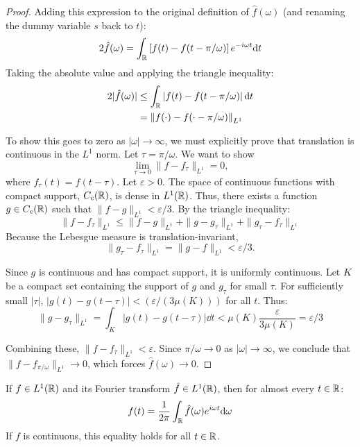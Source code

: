 \begin{proof}
Adding this expression to the original definition of $\hat{f}(\omega)$ (and renaming the dummy variable $s$ back to $t$):
\begin{equation}
2\hat{f}(\omega) = \int_{\mathbb{R}} \left[ f(t) - f(t - \pi/\omega) \right] e^{-i\omega t} \mathrm{d} t
\end{equation}
Taking the absolute value and applying the triangle inequality:
\begin{equation}
\begin{aligned}
2|\hat{f}(\omega)| &\leq \int_{\mathbb{R}} \left| f(t) - f(t - \pi/\omega) \right| \mathrm{d} t \\
&= \left\| f(\cdot) - f(\cdot - \pi/\omega) \right\|_{L^1}
\end{aligned}
\end{equation}

To show this goes to zero as $|\omega| \to \infty$, we must explicitly prove that translation is continuous in the $L^1$ norm. Let $\tau = \pi/\omega$. We want to show \[
\lim_{\tau \to 0} \|f - f_\tau\|_{L^1} = 0,
\] where $f_\tau(t) = f(t-\tau)$.
Let $\varepsilon > 0$. The space of continuous functions with compact support, $C_c(\mathbb{R})$, is dense in $L^1(\mathbb{R})$. Thus, there exists a function $g \in C_c(\mathbb{R})$ such that $\|f - g\|_{L^1} < \varepsilon/3$. By the triangle inequality:
\begin{equation}
\|f - f_\tau\|_{L^1} \leq \|f - g\|_{L^1} + \|g - g_\tau\|_{L^1} + \|g_\tau - f_\tau\|_{L^1}
\end{equation}
Because the Lebesgue measure is translation-invariant,
\[
\|g_\tau - f_\tau\|_{L^1} = \|g - f\|_{L^1} < \varepsilon/3.
\]

Since $g$ is continuous and has compact support, it is uniformly continuous. Let $K$ be a compact set containing the support of $g$ and $g_\tau$ for small $\tau$. For sufficiently small $|\tau|$, $|g(t) - g(t-\tau)| < (\varepsilon/(3 \mu(K)))$ for all $t$. Thus:
\begin{equation}
\|g - g_\tau\|_{L^1} = \int_K |g(t) - g(t-\tau)| \dd t < \mu(K) \frac{\varepsilon}{3 \mu(K)} = \varepsilon/3
\end{equation}

Combining these, $\|f - f_\tau\|_{L^1} < \varepsilon$. Since $\pi/\omega \to 0$ as $|\omega| \to \infty$, we conclude that $\|f - f_{\pi/\omega}\|_{L^1} \to 0$, which forces $\hat{f}(\omega) \to 0$.
\end{proof}

\begin{theorem}
If $f \in L^1(\mathbb{R})$ and its Fourier transform $\hat{f} \in L^1(\mathbb{R})$, then for almost every $t \in \mathbb{R}$:
\begin{equation}
f(t) = \frac{1}{2\pi} \int_{\mathbb{R}} \hat{f}(\omega) e^{i\omega t} \mathrm{d} \omega
\end{equation}
If $f$ is continuous, this equality holds for all $t \in \mathbb{R}$.
\end{theorem}

